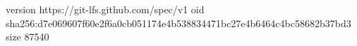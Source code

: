 version https://git-lfs.github.com/spec/v1
oid sha256:d7e069607f60e2f6a0cb051174e4b538834471bc27e4b6464c4bc58682b37bd3
size 87540
